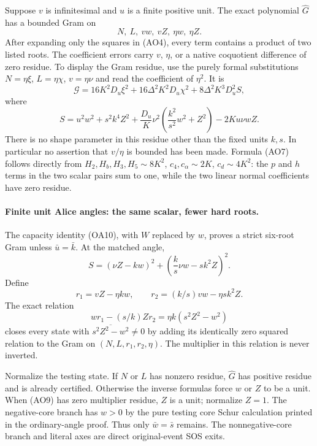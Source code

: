 Suppose $v$ is infinitesimal and $u$ is a finite positive unit.
The exact polynomial $\widehat G$ has a bounded Gram on
\[
                    N,\ L,\ vw,\ vZ,\ \eta w,\ \eta Z.
                                                               \tag{AO6}
\]
After expanding only the squares in (AO4), every term contains a
product of two listed roots. The coefficient errors carry $v$, $\eta$,
or a native coquotient difference of zero residue. To display the
Gram residue, use the purely formal substitutions
$N=\eta\xi$, $L=\eta\chi$, $v=\eta\nu$ and read the coefficient of
$\eta^2$. It is
\[
 \mathcal G=16K^2D_u\xi^2+16\Delta^2K^2D_u\chi^2
                         +8\Delta^2K^3D_u^2S,        \tag{AO7}
\]
where
\[
 S=u^2w^2+s^2k^4Z^2+
   \frac{D_u}{K}\nu^2\left(\frac{k^2}{s^2}w^2+Z^2\right)
   -2Ku\nu wZ.                                       \tag{AO8}
\]
There is no shape parameter in this residue other than the fixed
units $k,s$. In particular no assertion that $v/\eta$ is bounded
has been made. Formula (AO7) follows directly from
$H_2,H_b,H_3,H_5\sim8K^2$, $c_4,c_\alpha\sim2K$, $c_d\sim4K^2$:
the $p$ and $h$ terms in the two scalar pairs sum to one, while the
two linear normal coefficients have zero residue.

\paragraph{Finite unit Alice angles: the same scalar, fewer hard roots.}
The capacity identity (OA10), with $W$ replaced by $w$, proves a
strict six-root Gram unless $\bar u=\bar k$. At the matched angle,
\[
 S=(\nu Z-kw)^2+
       \left(\frac{k}{s}\nu w-sk^2Z\right)^2.
\]
Define
\[
 r_1=vZ-\eta kw,\qquad r_2=(k/s)vw-\eta sk^2Z.
\]
The exact relation
\[
 wr_1-(s/k)Zr_2=\eta k(s^2Z^2-w^2)                    \tag{AO9}
\]
closes every state with $\overline{s^2Z^2-w^2}\ne0$ by adding its
identically zero squared relation to the Gram on $(N,L,r_1,r_2,\eta)$.
The multiplier in this relation is never inverted.

Normalize the testing state. If $N$ or $L$ has nonzero residue,
$\widehat G$ has positive residue and is already certified. Otherwise
the inverse formulas force $w$ or $Z$ to be a unit. When (AO9) has
zero multiplier residue, $Z$ is a unit; normalize $Z=1$.
The negative-core branch has $w>0$ by the pure testing core Schur
calculation printed in the ordinary-angle proof. Thus only
$\bar w=\bar s$ remains. The nonnegative-core branch and literal
axes are direct original-event SOS exits.

